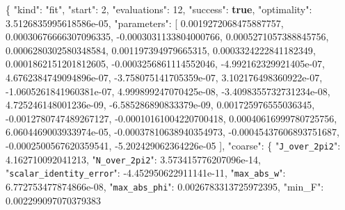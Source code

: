 \documentclass[
  10pt,
]{article}
\newenvironment{Shaded}{}{}
\newcommand{\DataTypeTok}[1]{\textcolor[rgb]{0.56,0.13,0.00}{#1}}
\newcommand{\DecValTok}[1]{\textcolor[rgb]{0.25,0.63,0.44}{#1}}
\newcommand{\FloatTok}[1]{\textcolor[rgb]{0.25,0.63,0.44}{#1}}
\newcommand{\FunctionTok}[1]{\textcolor[rgb]{0.02,0.16,0.49}{#1}}
\newcommand{\KeywordTok}[1]{\textcolor[rgb]{0.00,0.44,0.13}{\textbf{#1}}}
\newcommand{\OtherTok}[1]{\textcolor[rgb]{0.00,0.44,0.13}{#1}}
\newcommand{\StringTok}[1]{\textcolor[rgb]{0.25,0.44,0.63}{#1}}
\begin{document}
\begin{Shaded}
\begin{Highlighting}[]
\FunctionTok{\{}
  \DataTypeTok{"kind"}\FunctionTok{:} \StringTok{"fit"}\FunctionTok{,}
  \DataTypeTok{"start"}\FunctionTok{:} \DecValTok{2}\FunctionTok{,}
  \DataTypeTok{"evaluations"}\FunctionTok{:} \DecValTok{12}\FunctionTok{,}
  \DataTypeTok{"success"}\FunctionTok{:} \KeywordTok{true}\FunctionTok{,}
  \DataTypeTok{"optimality"}\FunctionTok{:} \FloatTok{3.5126835995618586e{-}05}\FunctionTok{,}
  \DataTypeTok{"parameters"}\FunctionTok{:} \OtherTok{[}
    \FloatTok{0.0019272068475887757}\OtherTok{,}
    \FloatTok{0.00030676666307096335}\OtherTok{,}
    \FloatTok{{-}0.0003031133804000766}\OtherTok{,}
    \FloatTok{0.0005271057388845756}\OtherTok{,}
    \FloatTok{0.0006280302580348584}\OtherTok{,}
    \FloatTok{0.001197394979665315}\OtherTok{,}
    \FloatTok{0.0003324222841182349}\OtherTok{,}
    \FloatTok{0.0001862151201812605}\OtherTok{,}
    \FloatTok{{-}0.0003256861114552046}\OtherTok{,}
    \FloatTok{{-}4.992162329921405e{-}07}\OtherTok{,}
    \FloatTok{4.6762384749094896e{-}07}\OtherTok{,}
    \FloatTok{{-}3.758075141705359e{-}07}\OtherTok{,}
    \FloatTok{3.102176498360922e{-}07}\OtherTok{,}
    \FloatTok{{-}1.0605261841960381e{-}07}\OtherTok{,}
    \FloatTok{4.999899247070425e{-}08}\OtherTok{,}
    \FloatTok{{-}3.4098355732731234e{-}08}\OtherTok{,}
    \FloatTok{4.725246148001236e{-}09}\OtherTok{,}
    \FloatTok{{-}6.585286890833379e{-}09}\OtherTok{,}
    \FloatTok{0.001725976555036345}\OtherTok{,}
    \FloatTok{{-}0.0012780747489267127}\OtherTok{,}
    \FloatTok{{-}0.00010161004220700418}\OtherTok{,}
    \FloatTok{0.00040616999780725756}\OtherTok{,}
    \FloatTok{6.0604469003933974e{-}05}\OtherTok{,}
    \FloatTok{{-}0.00037810638940354973}\OtherTok{,}
    \FloatTok{{-}0.00045437606893751687}\OtherTok{,}
    \FloatTok{{-}0.0002500567620359541}\OtherTok{,}
    \FloatTok{{-}5.202429062364226e{-}05}
  \OtherTok{]}\FunctionTok{,}
  \DataTypeTok{"coarse"}\FunctionTok{:} \FunctionTok{\{}
    \DataTypeTok{"\nolinkurl{J_over_2pi2}"}\FunctionTok{:} \FloatTok{4.162710092041213}\FunctionTok{,}
    \DataTypeTok{"\nolinkurl{N_over_2pi2}"}\FunctionTok{:} \FloatTok{3.573415776207096e{-}14}\FunctionTok{,}
    \DataTypeTok{"\nolinkurl{scalar_identity_error}"}\FunctionTok{:} \FloatTok{{-}4.452950622911141e{-}11}\FunctionTok{,}
    \DataTypeTok{"\nolinkurl{max_abs_w}"}\FunctionTok{:} \FloatTok{6.772753477874866e{-}08}\FunctionTok{,}
    \DataTypeTok{"\nolinkurl{max_abs_phi}"}\FunctionTok{:} \FloatTok{0.0026783313725972395}\FunctionTok{,}
    \DataTypeTok{"min\_F"}\FunctionTok{:} \FloatTok{0.002299097070379383}

\end{Highlighting}
\end{Shaded}
\end{document}
